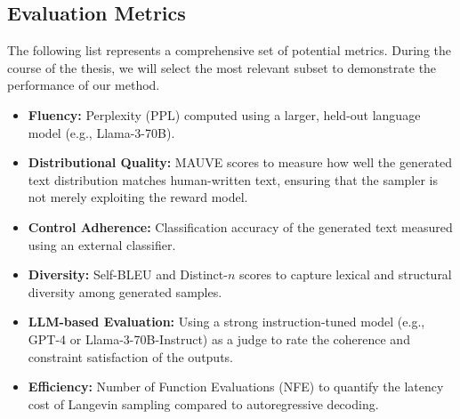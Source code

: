 \documentclass[11pt]{article}
\begin{document}

\subsection{Evaluation Metrics}
\label{subsec:evaluation_metrics}


The following list represents a comprehensive set of potential metrics. During the course of the thesis, we will select the most relevant subset to demonstrate the performance of our method.

\begin{itemize}
    \item \textbf{Fluency:} Perplexity (PPL) computed using a larger, held-out language model (e.g., Llama-3-70B).
    \item \textbf{Distributional Quality:} MAUVE scores to measure how well the generated text distribution matches human-written text, ensuring that the sampler is not merely exploiting the reward model.
    \item \textbf{Control Adherence:} Classification accuracy of the generated text measured using an external classifier.
    \item \textbf{Diversity:} Self-BLEU and Distinct-$n$ scores to capture lexical and structural diversity among generated samples.
    \item \textbf{LLM-based Evaluation:} Using a strong instruction-tuned model (e.g., GPT-4 or Llama-3-70B-Instruct) as a judge to rate the coherence and constraint satisfaction of the outputs.
    \item \textbf{Efficiency:} Number of Function Evaluations (NFE) to quantify the latency cost of Langevin sampling compared to autoregressive decoding.
\end{itemize}
\end{document}
